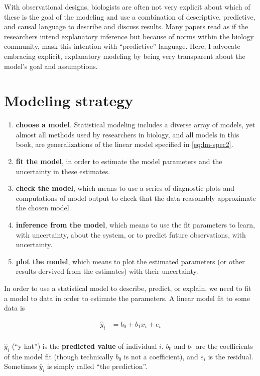 \documentclass[]{book}
\begin{document}
With observational designs, biologists are often not very explicit about
which of these is the goal of the modeling and use a combination of
descriptive, predictive, and causal language to describe and discuss
results. Many papers read as if the researchers intend explanatory
inference but because of norms within the biology community, mask this
intention with ``predictive'' language. Here, I advocate embracing
explicit, explanatory modeling by being very transparent about the
model's goal and assumptions.

\section{Modeling strategy}\label{modeling-strategy}

\begin{enumerate}
\def\labelenumi{\arabic{enumi}.}
\item
  \textbf{choose a model}. Statistical modeling includes a diverse array
  of models, yet almost all methods used by researchers in biology, and
  all models in this book, are generalizations of the linear model
  specified in \eqref{eq:lm-spec2}.
\item
  \textbf{fit the model}, in order to estimate the model parameters and
  the uncertainty in these estimates.
\item
  \textbf{check the model}, which means to use a series of diagnostic
  plots and computations of model output to check that the data
  reasonably approximate the chosen model.
\item
  \textbf{inference from the model}, which means to use the fit
  parameters to learn, with uncertainty, about the system, or to predict
  future observations, with uncertainty.
\item
  \textbf{plot the model}, which means to plot the estimated parameters
  (or other results dervived from the estimates) with their uncertainty.
\end{enumerate}

In order to use a statistical model to describe, predict, or explain, we
need to fit a model to data in order to estimate the parameters. A
linear model fit to some data is

\begin{align}
\hat{y}_i &= b_0 + b_1 x_i + e_i\\
\label{eq:yhat}
\end{align}

\(\hat{y}_i\) (``y hat'') is the \textbf{predicted value} of individual
\(i\), \(b_0\) and \(b_1\) are the coefficients of the model fit (though
technically \(b_0\) is not a coefficient), and \(e_i\) is the residual.
Sometimes \(\hat{y}_i\) is simply called ``the prediction''.
\end{document}
